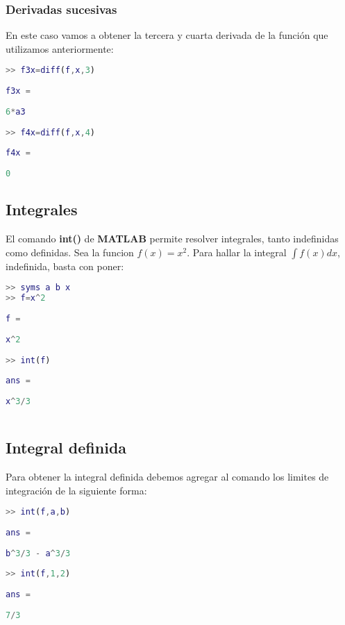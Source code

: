 \subsubsection{Derivadas sucesivas}
En este caso vamos a obtener la tercera y cuarta derivada de la función que utilizamos anteriormente:
\begin{lstlisting}[language=Matlab]
>> f3x=diff(f,x,3)
 
f3x =
 
6*a3
 
>> f4x=diff(f,x,4)
 
f4x =
 
0

\end{lstlisting}

\subsection{Integrales}
El comando \textbf{int()} de \textbf{MATLAB} permite resolver integrales, tanto indefinidas como definidas. Sea la funcion $f(x)=x^{2}$. Para hallar la integral $\int f(x)dx$, indefinida, basta con poner:

\begin{lstlisting}[language=Matlab]
>> syms a b x
>> f=x^2
 
f =
 
x^2
 
>> int(f)
 
ans =
 
x^3/3
 
\end{lstlisting}

\subsection{Integral definida}
Para obtener la integral definida debemos agregar al comando los limites de integración de la siguiente forma:

\begin{lstlisting}[language=Matlab]
>> int(f,a,b)
 
ans =
 
b^3/3 - a^3/3
 
>> int(f,1,2)
 
ans =
 
7/3

\end{lstlisting}
